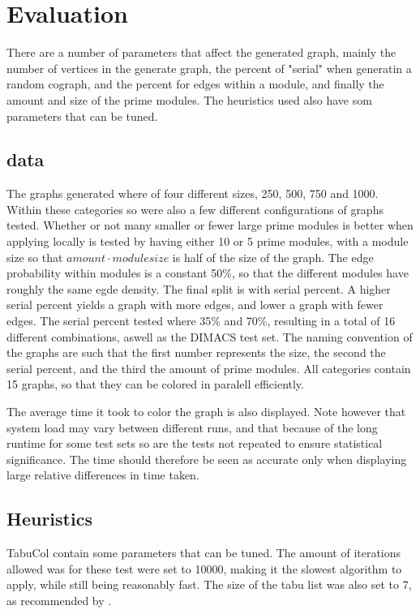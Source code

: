 \documentclass{amsart}
\begin{document}
\section{Evaluation}
\label{sec:Evaluation}
There are a number of parameters that affect the generated graph, mainly the
number of vertices in the generate graph, the percent of "serial" when generatin
a random cograph, and the percent for edges within a module, and finally the
amount and size of the prime modules. The heuristics used also have som
parameters that can be tuned.

\subsection{data}

The graphs generated where of four different sizes, 250, 500, 750 and 1000. 
Within these categories so were also a few different configurations of graphs
tested. Whether or not many smaller or fewer large prime modules is better when
applying locally is tested by having either 10 or 5 prime modules, with a module
size so that $amount \cdot module size$ is half of the size of the graph. The
edge probability within modules is a  constant 50\%, so that the different
modules have roughly the same egde density. The final split is with serial
percent. A higher serial percent yields a graph with more edges, and lower a
graph with fewer  edges. The serial percent tested where 35\% and 70\%,
resulting in a total of 16 different combinations, aswell as the DIMACS test
set. The naming convention of the graphs are such that the first number
represents the size, the second the serial percent, and the third the amount of
prime modules. All categories contain 15 graphs, so that they can be colored in
paralell efficiently.

The average time it took to color the graph is also displayed. Note however that
system load may vary between different runs, and that because of the long
runtime for some test sets so are the tests not repeated to ensure statistical
significance. The time should therefore be seen as accurate only when displaying
large relative differences in time taken.

\subsection{Heuristics}
TabuCol contain some parameters that can be tuned. The amount of
iterations allowed was for these test were set to 10000, making it the slowest
algorithm to apply, while still being reasonably fast. The size of the tabu list 
was also set to 7, as recommended by \cite{1990}.
\end{document}
